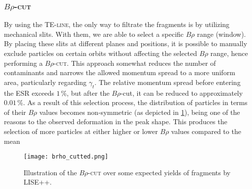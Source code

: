 \subsubsection{\textsc{$B\rho$-cut}}\label{subsubsec:chap2:brocut}
By using the \textsc{TE-line}, the only way to filtrate the fragments is by utilizing mechanical slits. With them, we are able to select a specific $B\rho$ range (window). By placing these slits at different planes and positions, it is possible to manually exclude particles on certain orbits without affecting the selected $B\rho$ range, hence performing a \textsc{$B\rho$-cut}. This approach somewhat reduces the number of contaminants and narrows the allowed momentum spread to a more uniform area, particularly regarding $\gamma_t$. The relative momentum spread before entering the \textsc{ESR} exceeds $1$\,\%, but after the $B\rho$-cut, it can be reduced to approximately $0.01$\,\%.
\newpar
As a result of this selection process, the distribution of particles in terms of their $B\rho$ values becomes non-symmetric (as depicted in \cref{fig:chap2:brhocut}), being one of the reasons to the observed deformation in the peak shape. This produces the selection of more particles at either higher or lower $B\rho$ values compared to the mean 
\begin{figure}[hbt]
    \centering
    \texttt{[image: brho\_cutted.png]}
    \caption{Illustration of the \textsc{$B\rho$-cut} over some expected yields of fragments by \textsc{LISE++}.}
    \label{fig:chap2:brhocut}
\end{figure}

